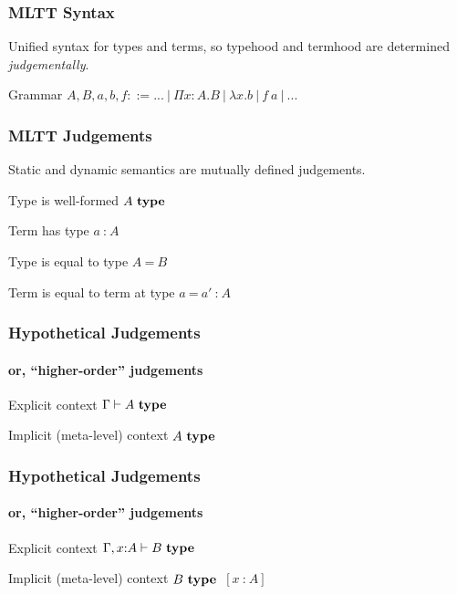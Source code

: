 \documentclass[mathserif,usenames,dvipsnames]{beamer}
\newcommand{\istype}[1]{\ensuremath{#1 ~\textbf{\textrm{type}}}}
\newcommand{\isterm}[2]{\ensuremath{#1 ~\textbf{{:}}~ #2}}
\newcommand{\eqtype}[2]{\ensuremath{#1 ~\textbf{=}~ #2}}
\newcommand{\eqterm}[3]{\ensuremath{#1 ~\textbf{=}~ #2 ~\textbf{{:}}~ #3}}
\newcommand{\hyps}[1]{\ensuremath{~[#1]}}
\newcommand{\hyp}[1]{\hyps{\isterm{x}{#1}}}
\newcommand{\Funv}[3]{\ensuremath{\Pi #1{:}#2. #3}}
\newcommand{\Fun}[2]{\Funv{x}{#1}{#2}}
\newcommand{\funv}[2]{\ensuremath{\lambda #1. #2}}
\newcommand{\fun}[1]{\funv{x}{#1}}
\newcommand{\app}[2]{\ensuremath{#1~#2}}
\begin{document}
\begin{frame}
\frametitle{MLTT Syntax}

Unified syntax for types and terms,
so typehood and termhood are determined \textit{judgementally}.

\begin{block}{Grammar}
$A,B,a,b,f ::= ...~|~\Fun{A}{B}~|~\fun{b}~|~\app{f}{a}~|~...$
\end{block}

\end{frame}


\begin{frame}
\frametitle{MLTT Judgements}

Static and dynamic semantics are mutually defined judgements.

\begin{block}{Type is well-formed}
\istype{A}
\end{block}

\begin{block}{Term has type}
\isterm{a}{A}
\end{block}

\begin{block}{Type is equal to type}
\eqtype{A}{B}
\end{block}

\begin{block}{Term is equal to term at type}
\eqterm{a}{a'}{A}
\end{block}

\end{frame}

\begin{frame}
\frametitle{Hypothetical Judgements}
\framesubtitle{or, ``higher-order'' judgements}

\begin{block}{Explicit context}
$\Gamma \vdash \istype{A}$
\end{block}

\begin{block}{Implicit (meta-level) context}
\istype{A}
\end{block}

\end{frame}

\begin{frame}
\frametitle{Hypothetical Judgements}
\framesubtitle{or, ``higher-order'' judgements}

\begin{block}{Explicit context}
$\Gamma, x{:}A \vdash \istype{B}$
\end{block}

\begin{block}{Implicit (meta-level) context}
\istype{B} \hyp{A}
\end{block}

\end{frame}
\end{document}
